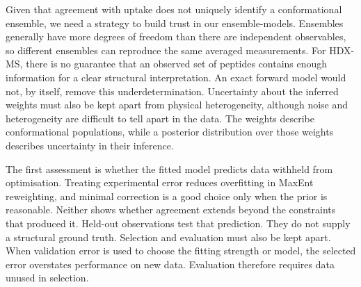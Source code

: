 Given that agreement with uptake does not uniquely identify a conformational ensemble, we need a strategy to build trust in our ensemble-models. Ensembles generally have more degrees of freedom than there are independent observables, so different ensembles can reproduce the same averaged measurements.\supercite{berlinRecoveringRepresentativeConformational2013,bonomiPrinciplesProteinStructural2017} For HDX-MS, there is no guarantee that an observed set of peptides contains enough information for a clear structural interpretation.\supercite{bradshawInterpretationHDXData2020} An exact forward model would not, by itself, remove this underdetermination. Uncertainty about the inferred weights must also be kept apart from physical heterogeneity, although noise and heterogeneity are difficult to tell apart in the data.\supercite{bonomiPrinciplesProteinStructural2017} The weights describe conformational populations, while a posterior distribution over those weights describes uncertainty in their inference.\supercite{bmsb2012ch12}

The first assessment is whether the fitted model predicts data withheld from optimisation. Treating experimental error reduces overfitting in MaxEnt reweighting, and minimal correction is a good choice only when the prior is reasonable.\supercite{cesariUsingMaximumEntropy2018} Neither shows whether agreement extends beyond the constraints that produced it. Held-out observations test that prediction. They do not supply a structural ground truth. Selection and evaluation must also be kept apart. When validation error is used to choose the fitting strength or model, the selected error overstates performance on new data.\supercite{cawleyOverfittingModelSelection2010} Evaluation therefore requires data unused in selection.

